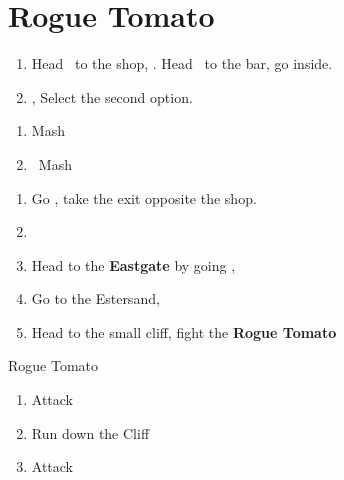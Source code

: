 \chapter{Rogue Tomato}
\begin{enumerate}
\item Head \south\ to the shop, \cs. Head \north\ to the bar, go inside.
\item \cs, Select the second option.
\end{enumerate}
\begin{liscense}
\begin{enumerate}
\item Mash
\item \squarec\ Mash
\end{enumerate}
\end{liscense}
\begin{enumerate}
\item Go \south, take the exit opposite the shop.
\item {}
\item Head to the \textbf{Eastgate} by going \east, \cs
\item Go to the Estersand, \cs
\item Head to the small cliff, fight the \textbf{Rogue Tomato}
\end{enumerate}
\begin{battle}{Rogue Tomato}
\begin{enumerate}
\item Attack
\item Run down the Cliff
\item Attack
\end{enumerate}
\end{battle}